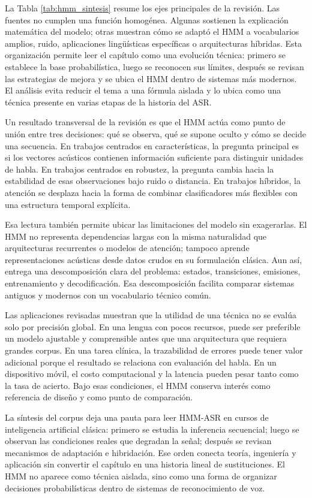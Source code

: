 La Tabla \ref{tab:hmm_sintesis} resume los ejes principales de la revisión. Las fuentes no cumplen una función homogénea. Algunas sostienen la explicación matemática del modelo; otras muestran cómo se adaptó el HMM a vocabularios amplios, ruido, aplicaciones lingüísticas específicas o arquitecturas híbridas. Esta organización permite leer el capítulo como una evolución técnica: primero se establece la base probabilística, luego se reconocen sus límites, después se revisan las estrategias de mejora y se ubica el HMM dentro de sistemas más modernos. El análisis evita reducir el tema a una fórmula aislada y lo ubica como una técnica presente en varias etapas de la historia del ASR.

Un resultado transversal de la revisión es que el HMM actúa como punto de unión entre tres decisiones: qué se observa, qué se supone oculto y cómo se decide una secuencia. En trabajos centrados en características, la pregunta principal es si los vectores acústicos contienen información suficiente para distinguir unidades de habla. En trabajos centrados en robustez, la pregunta cambia hacia la estabilidad de esas observaciones bajo ruido o distancia. En trabajos híbridos, la atención se desplaza hacia la forma de combinar clasificadores más flexibles con una estructura temporal explícita.

Esa lectura también permite ubicar las limitaciones del modelo sin exagerarlas. El HMM no representa dependencias largas con la misma naturalidad que arquitecturas recurrentes o modelos de atención; tampoco aprende representaciones acústicas desde datos crudos en su formulación clásica. Aun así, entrega una descomposición clara del problema: estados, transiciones, emisiones, entrenamiento y decodificación. Esa descomposición facilita comparar sistemas antiguos y modernos con un vocabulario técnico común.

Las aplicaciones revisadas muestran que la utilidad de una técnica no se evalúa solo por precisión global. En una lengua con pocos recursos, puede ser preferible un modelo ajustable y comprensible antes que una arquitectura que requiera grandes corpus. En una tarea clínica, la trazabilidad de errores puede tener valor adicional porque el resultado se relaciona con evaluación del habla. En un dispositivo móvil, el costo computacional y la latencia pueden pesar tanto como la tasa de acierto. Bajo esas condiciones, el HMM conserva interés como referencia de diseño y como punto de comparación.

La síntesis del corpus deja una pauta para leer HMM-ASR en cursos de inteligencia artificial clásica: primero se estudia la inferencia secuencial; luego se observan las condiciones reales que degradan la señal; después se revisan mecanismos de adaptación e hibridación. Ese orden conecta teoría, ingeniería y aplicación sin convertir el capítulo en una historia lineal de sustituciones. El HMM no aparece como técnica aislada, sino como una forma de organizar decisiones probabilísticas dentro de sistemas de reconocimiento de voz.


